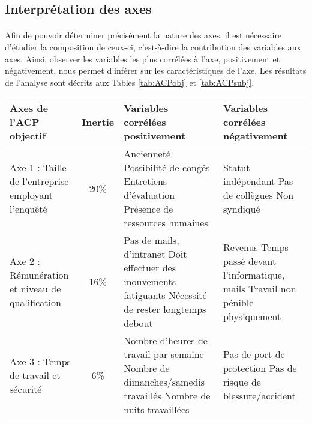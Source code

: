 \documentclass[11pt,fleqn,openany,frenchb]{book} %
\begin{document}
\subsection{Interprétation des axes}
\paragraph{}
Afin de pouvoir déterminer précisément la nature des axes, il est nécessaire d'étudier la composition de ceux-ci, c'est-à-dire la contribution des variables aux axes. Ainsi, observer les variables les plus corrélées à l'axe, positivement et négativement, nous permet d'inférer sur les caractéristiques de l'axe. Les résultats de l'analyse sont décrits aux Tables \ref{tab:ACPobj} et \ref{tab:ACPsubj}.

\begin{table}[!h]
\centering
\begin{tabular}{|p{3cm}|c|p{4.5cm}|p{4.5cm}|}
\hline
    Axes de l'ACP \newline objectif & Inertie &  Variables corrélées positivement & Variables corrélées négativement\\ 
    \hline
    Axe 1 : Taille de l'entreprise employant l'enquêté & 20\% & Ancienneté \newline Possibilité de congés \newline Entretiens d'évaluation \newline Présence de ressources humaines & Statut indépendant \newline Pas de collègues  \newline Non syndiqué \\
    \hline
    Axe 2 : Rémunération et niveau de qualification  & 16\%
    & Pas de mails, d'intranet 
    \newline Doit effectuer des mouvements fatiguants 
    \newline Nécessité de rester longtemps debout 
    & Revenus 
    \newline Temps passé devant l'informatique, mails 
    \newline Travail non pénible physiquement\\
    \hline
    Axe 3 : Temps de travail et sécurité & 6\% &  
    Nombre d'heures de travail par semaine 
    \newline Nombre de dimanches/samedis travaillés
    \newline Nombre de nuits travaillées
    & Pas de port de protection
    \newline Pas de risque de blessure/accident

\end{tabular}
\end{table}
\end{document}
